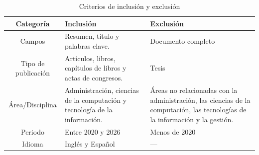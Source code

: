 \begin{table}[H]
	\centering
	\caption{Criterios de inclusión y exclusión}
	\label{tab:criterios-inclusion-exclusion}

	\renewcommand{\arraystretch}{1.2}
	\fontsize{9pt}{10pt}\selectfont

	\begin{tabularx}{\textwidth}{|c|X|X|}
		\hline
		\tableheader
		\textbf{Categoría}                                                         &
		\textbf{Inclusión}                                                         &
		\textbf{Exclusión}
		\\
		\hline
		Campos                                                                     &
		Resumen, título y palabras clave.                                          &
		Documento completo
		\\
		\hline
		Tipo de publicación                                                        &
		Artículos, libros, capítulos de libros y actas de congresos.               &
		Tesis
		\\
		\hline
		Área/Disciplina                                                            &
		Administración, ciencias de la computación y tecnología de la información. &
		Áreas no relacionadas con la administración, las ciencias de la computación, las tecnologías de la información y la gestión.
		\\
		\hline
		Periodo                                                                    &
		Entre 2020 y 2026                                                          &
		Menos de 2020
		\\
		\hline
		Idioma                                                                     &
		Inglés y Español                                                           &
		---
		\\
		\hline
	\end{tabularx}
\end{table}
